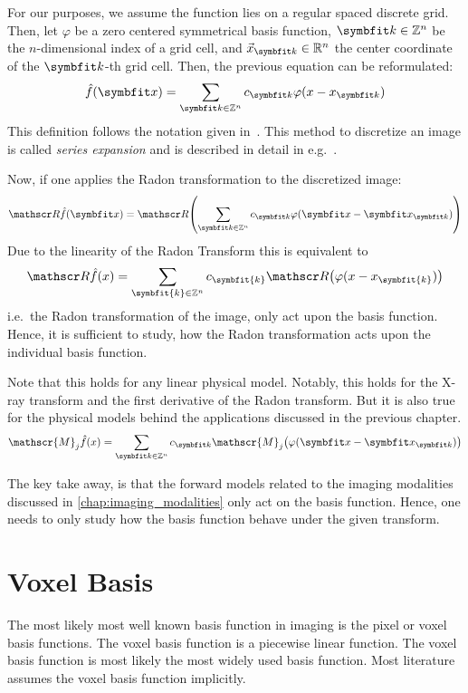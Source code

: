 
For our purposes, we assume the function lies on a regular spaced discrete grid. Then, let
\(\varphi\) be a zero centered symmetrical basis function, \(\mvec{k} \in \mathbb{Z}^n\) be the
\(n\)-dimensional index of a grid cell, and \(\vec{x}_{\mvec{k}} \in \mathbb{R}^n\) the center
coordinate of the \(\mvec{k}\)-th grid cell. Then, the previous equation can be reformulated:
\[ \near{f}(\mvec{x}) = \sum_{\mvec{k} \in \mathbb{Z}^n} c_{\mvec{k}} \varphi(x - x_{\mvec{k}}) \]
This definition follows the notation given in~\cite{momey_new_2011}. This method to discretize an
image is called \textit{series expansion} and is described in detail in
e.g.\ \cite{herman_basis_2015}.

Now, if one applies the Radon transformation to the discretized image: 
\[ \radon\near{f}(\mvec{x}) = \radon\left( \sum_{\mvec{k} \in \mathbb{Z}^n} c_{\mvec{k}} \varphi(\mvec{x} - \mvec{x}_{\mvec{k}}) \right) \]
Due to the linearity of the Radon Transform this is equivalent to
\[ \radon\hat{f}(x) = \sum_{\symbfit{k} \in \mathbb{Z}^n} c_{\symbfit{k}}\radon\left( \varphi(x - x_{\symbfit{k}}) \right) \]
i.e.\ the Radon transformation of the image, only act upon the basis function. Hence, it is
sufficient to study, how the Radon transformation acts upon the individual basis function.

Note that this holds for any linear physical model. Notably, this holds for the X-ray transform and
the first derivative of the Radon transform. But it is also true for the physical models behind the
applications discussed in the previous chapter.
\[ \mathscr{M}_j\near{f}(x) = \sum_{\mvec{k} \in \mathbb{Z}^n} c_{\mvec{k}}\mathscr{M}_j\left( \varphi(\mvec{x} - \mvec{x}_{\mvec{k}}) \right) \]

The key take away, is that the forward models related to the imaging modalities discussed in
\autoref{chap:imaging_modalities} only act on the basis function. Hence, one needs to only study how
the basis function behave under the given transform.

\section{Voxel Basis}\label{sec:voxel_basis}

The most likely most well known basis function in imaging is the pixel or voxel basis functions. The
voxel basis function is a piecewise linear function. The voxel basis function is most likely the
most widely used basis function. Most literature assumes the voxel basis function implicitly.

